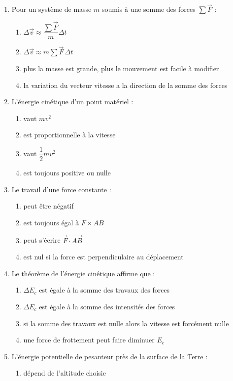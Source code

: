 \documentclass[11pt,a4paper]{article}
\begin{document}
\begin{enumerate}[label=\textbf{QCM \arabic*.},leftmargin=*]
\item Pour un système de masse $m$ soumis à une somme des forces $\sum \vec F$ :
\begin{enumerate}[label=\alph*)]
\item $\Delta \vec v \approx \dfrac{\sum \vec F}{m}\Delta t$
\item $\Delta \vec v \approx m\sum \vec F\,\Delta t$
\item plus la masse est grande, plus le mouvement est facile à modifier
\item la variation du vecteur vitesse a la direction de la somme des forces
\end{enumerate}
\item L'énergie cinétique d'un point matériel :
\begin{enumerate}[label=\alph*)]
\item vaut $mv^2$
\item est proportionnelle à la vitesse
\item vaut $\dfrac12 mv^2$
\item est toujours positive ou nulle
\end{enumerate}
\item Le travail d'une force constante :
\begin{enumerate}[label=\alph*)]
\item peut être négatif
\item est toujours égal à $F\times AB$
\item peut s'écrire $\vec F\cdot \vec{AB}$
\item est nul si la force est perpendiculaire au déplacement
\end{enumerate}
\item Le théorème de l'énergie cinétique affirme que :
\begin{enumerate}[label=\alph*)]
\item $\Delta E_c$ est égale à la somme des travaux des forces
\item $\Delta E_c$ est égale à la somme des intensités des forces
\item si la somme des travaux est nulle alors la vitesse est forcément nulle
\item une force de frottement peut faire diminuer $E_c$
\end{enumerate}
\item L'énergie potentielle de pesanteur près de la surface de la Terre :
\begin{enumerate}[label=\alph*)]
\item dépend de l'altitude choisie

\end{enumerate}
\end{enumerate}
\end{document}
